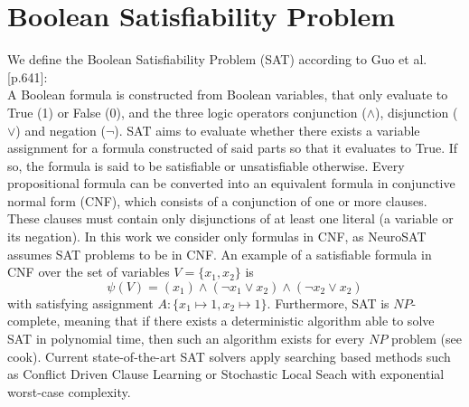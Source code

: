 \section{Boolean Satisfiability Problem}
We define the Boolean Satisfiability Problem (SAT) according to Guo et al.\cite{guo2023machine}[p.641]: \\
A Boolean formula is constructed from Boolean variables, that only evaluate to True (1) or False (0), and the three logic operators conjunction ($\wedge$), disjunction ($\vee$) and negation ($\neg$). SAT aims to evaluate whether there exists a variable assignment for a formula constructed of said parts so that it evaluates to True. If so, the formula is said to be satisfiable or unsatisfiable otherwise. Every propositional formula can be converted into an equivalent formula in conjunctive normal form (CNF), which consists of a conjunction of one or more clauses. These clauses must contain only disjunctions of at least one literal (a variable or its negation). In this work we consider only formulas in CNF, as NeuroSAT\cite{selsam2018learning} assumes SAT problems to be in CNF. An example of a satisfiable formula in CNF over the set of variables $V=\{x_1,x_2\}$ is 
$$\psi(V) = (x_1) \land (\neg x_1 \lor x_2) \land (\neg x_2 \lor x_2)$$
with satisfying assignment $A:\{x_1 \mapsto 1, x_2 \mapsto 1\}$. Furthermore, SAT is $NP$-complete, meaning that if there exists a deterministic algorithm able to solve SAT in polynomial time, then such an algorithm exists for every $NP$ problem (see cook\cite{cook2023complexity}). Current state-of-the-art SAT solvers apply searching based methods such as Conflict Driven Clause Learning\cite{marques1999grasp} or Stochastic Local Seach\cite{selman1993local} with exponential worst-case complexity.

